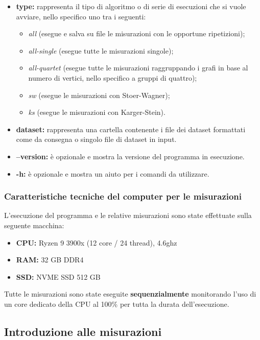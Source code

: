 \begin{itemize}
    \item \textbf{type:} rappresenta il tipo di algoritmo o di serie di esecuzioni che si vuole avviare, nello specifico uno tra i seguenti: 
    \begin{itemize}
        \item \textit{all} (esegue e salva su file le misurazioni con le opportune ripetizioni);
        \item \textit{all-single} (esegue tutte le misurazioni singole);
        \item \textit{all-quartet} (esegue tutte le misurazioni raggruppando i grafi in base al numero di vertici, nello specifico a gruppi di quattro);
        \item \textit{sw} (esegue le misurazioni con Stoer-Wagner);
        \item \textit{ks} (esegue le misurazioni con Karger-Stein).   
    \end{itemize} 
    \item \textbf{dataset:} rappresenta una cartella contenente i file dei dataset formattati come da consegna o singolo file di dataset in input. 
    \item \textbf{--version:} è opzionale e mostra la versione del programma in esecuzione. 
    \item \textbf{-h:} è opzionale e mostra un aiuto per i comandi da utilizzare. 
\end{itemize}

\subsubsection{Caratteristiche tecniche del computer per le misurazioni} 

L'esecuzione del programma e le relative misurazioni sono state effettuate sulla seguente macchina:
\begin{itemize}
    \item \textbf{CPU:} Ryzen 9 3900x (12 core / 24 thread), 4.6ghz
    \item \textbf{RAM:} 32 GB DDR4 
    \item \textbf{SSD:} NVME SSD 512 GB
\end{itemize}

\noindent Tutte le misurazioni sono state eseguite \textbf{sequenzialmente} monitorando l'uso di un core dedicato della CPU al 100\% per tutta la durata dell'esecuzione.


\subsection{Introduzione alle misurazioni} 

